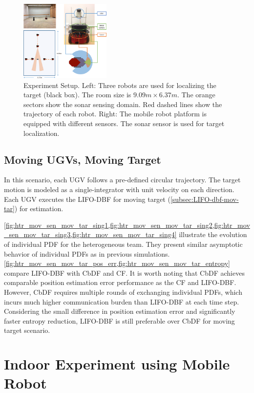 \documentclass[journal]{IEEEtranTIE}
\theoremstyle{remark}
\begin{document}
	\begin{figure}
		\centering
		\includegraphics[width=0.4\textwidth]{exp_setup_rdsize_16-TIE-3798}%
		\caption{Experiment Setup. Left: Three robots are used for localizing the target (black box). The room size is $9.09m\times 6.37m$. The orange sectors show the sonar sensing domain. Red dashed lines show the trajectory of each robot. Right: The mobile robot platform is equipped with different sensors. The sonar sensor is used for target localization.}\label{fig:exp_scene}
	\end{figure}
	
	\subsection{Moving UGVs, Moving Target}
	
	In this scenario, each UGV follows a pre-defined circular trajectory. 
	The target motion is modeled as a single-integrator with unit velocity on each direction.
	Each UGV executes the LIFO-DBF for moving target (\cref{subsec:LIFO-dbf-mov-tar}) for estimation.

	\cref{fig:htr_mov_sen_mov_tar_sing1,fig:htr_mov_sen_mov_tar_sing2,fig:htr_mov_sen_mov_tar_sing3,fig:htr_mov_sen_mov_tar_sing4} illustrate the evolution of individual PDF for the heterogeneous team.
	They present similar asymptotic behavior of individual PDFs as in previous simulations.	
	\cref{fig:htr_mov_sen_mov_tar_pos_err,fig:htr_mov_sen_mov_tar_entropy} compare LIFO-DBF with CbDF and CF.
	It is worth noting that CbDF achieves comparable position estimation error performance as the CF and LIFO-DBF.
	However, CbDF requires multiple rounds of exchanging individual PDFs, which incurs much higher communication burden than LIFO-DBF at each time step.
	Considering the small difference in position estimation error and significantly faster entropy reduction, LIFO-DBF is still preferable over CbDF for moving target scenario.
	
	\section{Indoor Experiment using Mobile Robot}\label{sec:exp}
	
\end{document}
